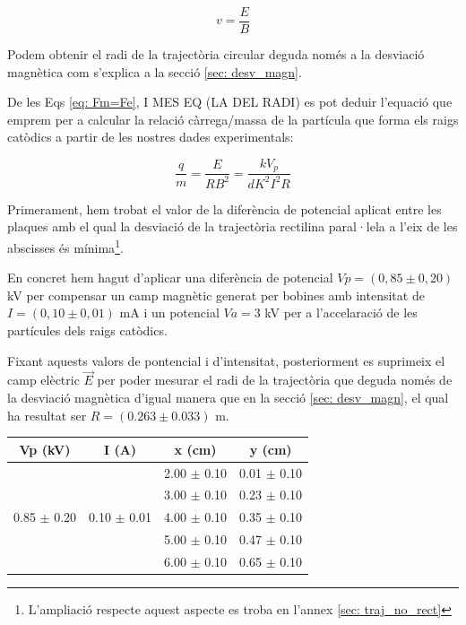 \documentclass[11pt]{article}
\begin{document}
\begin{equation}
    v = \frac{E}{B}
\end{equation}

Podem obtenir el radi de la trajectòria circular deguda només a la desviació magnètica com s'explica a la secció \ref{sec: desv_magn}.

De les Eqs \eqref{eq: Fm=Fe}, I MES EQ (LA DEL RADI) es pot deduir l'equació que emprem per a calcular la relació càrrega/massa de la partícula que forma els raigs catòdics a partir de les nostres dades experimentals:

\begin{equation}
    \frac{q}{m}=\frac{E}{RB^2}=\frac{kV_p}{dK^2I^2R}
\end{equation}

Primerament, hem trobat el valor de la diferència de potencial aplicat entre les plaques amb el qual la desviació de la trajectòria rectilina paral·lela a l'eix de les abscisses és mínima\footnote{L'ampliació respecte aquest aspecte es troba en l'annex \ref{sec: traj_no_rect}}. 

En concret hem hagut d'aplicar una diferència de potencial $Vp = (0,85 \pm 0,20 )$ kV per compensar un camp magnètic generat per bobines amb intensitat de $I = (0,10 \pm 0,01 )$ mA i un potencial $Va = 3$ kV per a l'accelaració de les partícules dels raigs catòdics.

Fixant aquests valors de pontencial i d'intensitat, posteriorment es suprimeix el camp elèctric $\vec{E}$ per poder mesurar el radi de la trajectòria que deguda només de la desviació magnètica d'igual manera que en la secció \ref{sec: desv_magn}, el qual ha resultat ser $R = (0.263 \pm 0.033)$ m.

\begin{table}[h!]
\centering
\begin{tabular}{|c|c|c|c|}
\hline
\textbf{Vp (kV)} & \textbf{I (A)} & \textbf{x (cm)} & \textbf{y (cm)} \\
\hline
 &  & 2.00 $\pm$ 0.10 & 0.01 $\pm$ 0.10 \\
 &  & 3.00 $\pm$ 0.10 & 0.23 $\pm$ 0.10 \\
0.85 $\pm$ 0.20 & 0.10 $\pm$ 0.01 & 4.00 $\pm$ 0.10 & 0.35 $\pm$ 0.10 \\
 &  & 5.00 $\pm$ 0.10 & 0.47 $\pm$ 0.10 \\
 &  & 6.00 $\pm$ 0.10 & 0.65 $\pm$ 0.10 \\
\hline
\end{tabular}
\end{table}
\end{document}
